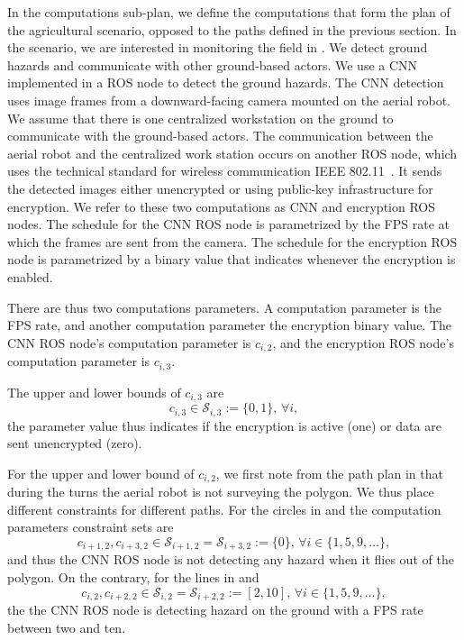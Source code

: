 In the computations sub-plan, we define the computations that form the plan of the agricultural scenario, opposed to the paths defined in the previous section. In the scenario, we are interested in monitoring the field in . We detect ground hazards and communicate with other ground-based actors. We use a CNN implemented in a ROS node to detect the ground hazards. The CNN detection uses image frames from a downward-facing camera mounted on the aerial robot. We assume that there is one centralized workstation on the ground to communicate with the ground-based actors. The communication between the aerial robot and the centralized work station occurs on another ROS node, which uses the technical standard for wireless communication IEEE 802.11~\citep{crow1997ieee}. It sends the detected images either unencrypted or using public-key infrastructure for encryption. We refer to these two computations as CNN and encryption ROS nodes. The schedule for the CNN ROS node is parametrized by the FPS rate at which the frames are sent from the camera. The schedule for the encryption ROS node is parametrized by a binary value that indicates whenever the encryption is enabled.

There are thus two computations parameters. A computation parameter is the FPS rate, and another computation parameter the encryption binary value. The CNN ROS node's computation parameter is $c_{i,2}$, and the encryption ROS node's computation parameter is $c_{i,3}$.

The upper and lower bounds of $c_{i,3}$ are 
\begin{equation}\label{eq:encr-comp-const}
  c_{i,3}\in\mathcal{S}_{i,3}:=\{0,1\},\,\forall i,
\end{equation}
the parameter value thus indicates if the encryption is active (one) or data are sent unencrypted (zero).

For the upper and lower bound of $c_{i,2}$, we first note from the path plan in  that during the turns the aerial robot is not surveying the polygon. We thus place different constraints for different paths. For the circles in  and  the computation parameters constraint sets are 
\begin{equation}
  c_{i+1,2},c_{i+3,2}\in\mathcal{S}_{i+1,2}=\mathcal{S}_{i+3,2}:=\{0\},\,\forall i\in\{1,5,9,\dots\},
\end{equation}
and thus the CNN ROS node is not detecting any hazard when it flies out of the polygon. On the contrary, for the lines in  and  
\begin{equation}\label{eq:cnn-comp-const}
c_{i,2},c_{i+2,2}\in\mathcal{S}_{i,2}=\mathcal{S}_{i+2,2}:=[2,10],\,\forall i\in\{1,5,9,\dots\},
\end{equation} 
the the CNN ROS node is detecting hazard on the ground with a FPS rate between two and ten.

